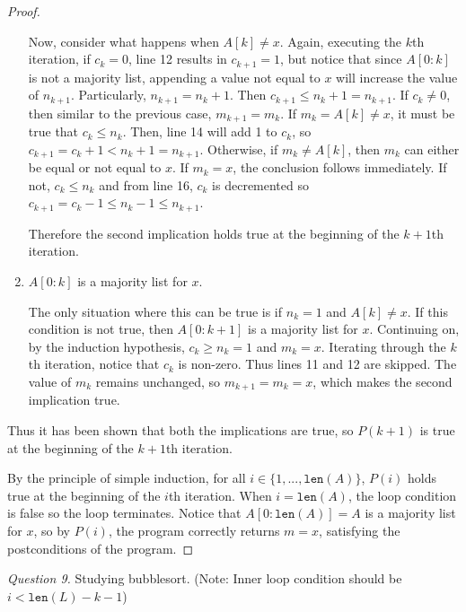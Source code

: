 \documentclass[11pt]{article}
\begin{document}
\begin{proof}
\begin{enumerate}
            Now, consider what happens when \(A[k]\neq x\). Again, executing the \(k\)th iteration, if \(c_k = 0\), line 12 results in \(c_{k+1} = 1\), but notice that since \(A[0:k]\) is not a majority list, appending a value not equal to \(x\) will increase the value of \(n_{k+1}\). Particularly, \(n_{k+1} = n_k + 1\). Then \(c_{k+1} \leq n_k + 1 = n_{k+1}\). If \(c_k \neq 0\), then similar to the previous case, \(m_{k+1} = m_k\). If \(m_k = A[k] \neq x\), it must be true that \(c_k \leq n_k\). Then, line 14 will add 1 to \(c_k\), so \(c_{k+1} = c_k + 1 < n_k + 1 = n_{k+1}\). Otherwise, if \(m_k \neq A[k]\), then \(m_k\) can either be equal or not equal to \(x\). If \(m_k = x\), the conclusion follows immediately. If not, \(c_k \leq n_k\) and from line 16, \(c_k\) is decremented so \(c_{k+1} = c_k - 1 \leq n_k - 1 \leq n_{k+1}\).

            Therefore the second implication holds true at the beginning of the \(k+1\)th iteration.

            \item \(A[0:k]\) is a majority list for \(x\).
            
            The only situation where this can be true is if \(n_k = 1\) and \(A[k] \neq x\). If this condition is not true, then \(A[0:k+1]\) is a majority list for \(x\). Continuing on, by the induction hypothesis, \(c_k \geq n_k = 1\) and \(m_k = x\). Iterating through the \(k\)th iteration, notice that \(c_k\) is non-zero. Thus lines 11 and 12 are skipped. The value of \(m_k\) remains unchanged, so \(m_{k+1} = m_k = x\), which makes the second implication true.
        \end{enumerate}
        Thus it has been shown that both the implications are true, so \(P(k+1)\) is true at the beginning of the \(k+1\)th iteration.

        By the principle of simple induction, for all \(i \in \{1,...,\texttt{len}(A)\}\), \(P(i)\) holds true at the beginning of the \(i\)th iteration. When \(i = \texttt{len}(A)\), the loop condition is false so the loop terminates. Notice that \(A[0:\texttt{len}(A)] = A\) is a majority list for \(x\), so by \(P(i)\), the program correctly returns \(m = x\), satisfying the postconditions of the program.
        
    \end{proof}
    \textit{Question 9.} Studying bubblesort. (Note: Inner loop condition should be \(i < \texttt{len}(L) -k-1\))
\end{document}
